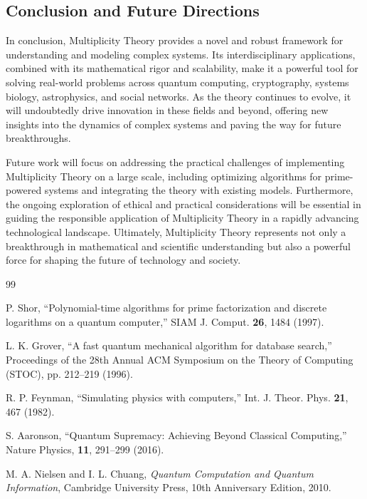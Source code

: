 \documentclass[%
 preprint, linenumbers,
 amsmath,amssymb,
 aps, physrev,
]{revtex4-2}
\begin{document}
\subsection{Conclusion and Future Directions}
In conclusion, Multiplicity Theory provides a novel and robust framework for understanding and modeling complex systems. Its interdisciplinary applications, combined with its mathematical rigor and scalability, make it a powerful tool for solving real-world problems across quantum computing, cryptography, systems biology, astrophysics, and social networks. As the theory continues to evolve, it will undoubtedly drive innovation in these fields and beyond, offering new insights into the dynamics of complex systems and paving the way for future breakthroughs.

Future work will focus on addressing the practical challenges of implementing Multiplicity Theory on a large scale, including optimizing algorithms for prime-powered systems and integrating the theory with existing models. Furthermore, the ongoing exploration of ethical and practical considerations will be essential in guiding the responsible application of Multiplicity Theory in a rapidly advancing technological landscape. Ultimately, Multiplicity Theory represents not only a breakthrough in mathematical and scientific understanding but also a powerful force for shaping the future of technology and society.



\begin{thebibliography}{99}

P. Shor, 
``Polynomial-time algorithms for prime factorization and discrete logarithms on a quantum computer,'' 
SIAM J. Comput. \textbf{26}, 1484 (1997).

L. K. Grover, 
``A fast quantum mechanical algorithm for database search,'' 
Proceedings of the 28th Annual ACM Symposium on the Theory of Computing (STOC), pp. 212–219 (1996).

R. P. Feynman, 
``Simulating physics with computers,'' 
Int. J. Theor. Phys. \textbf{21}, 467 (1982).

S. Aaronson, 
``Quantum Supremacy: Achieving Beyond Classical Computing,'' 
Nature Physics, \textbf{11}, 291–299 (2016).

M. A. Nielsen and I. L. Chuang, 
\textit{Quantum Computation and Quantum Information}, 
Cambridge University Press, 10th Anniversary Edition, 2010.

\end{thebibliography}
\end{document}

